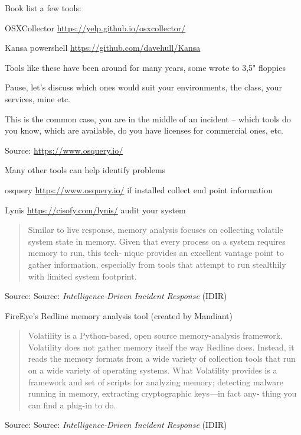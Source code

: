 \documentclass[Screen16to9,17pt]{foils}
\begin{document}
Book list a few tools:
\begin{list2}
\item OSXCollector \url{https://yelp.github.io/osxcollector/}
\item Kansa powershell \url{https://github.com/davehull/Kansa}
\item Tools like these have been around for many years, some wrote to 3,5" floppies
\end{list2}

Pause, let's discuss which ones would suit your environments, the class, your services, mine etc.

This is the common case, you are in the middle of an incident -- which tools do you know, which are available, do you have licenses for commercial ones, etc.


Source: \url{https://www.osquery.io/}

Many other tools can help identify problems
\begin{list2}
\item osquery \url{https://www.osquery.io/} if installed collect end point information
\item Lynis \url{https://cisofy.com/lynis/} audit your system
\end{list2}




\begin{quote}
Similar to live response, memory analysis focuses on collecting volatile system state
in memory. Given that every process on a system requires memory to run, this tech‐
nique provides an excellent vantage point to gather information, especially from tools
that attempt to run stealthily with limited system footprint.
\end{quote}
Source: Source: \emph{Intelligence-Driven Incident Response} (IDIR)

\begin{list2}
\item FireEye’s Redline memory analysis tool (created by Mandiant)
\end{list2}



\begin{quote}
Volatility is a Python-based, open source memory-analysis framework. Volatility does
not gather memory itself the way Redline does. Instead, it reads the memory formats
from a wide variety of collection tools that run on a wide variety of operating systems.
What Volatility provides is a framework and set of scripts for analyzing memory;
detecting malware running in memory, extracting cryptographic keys—in fact any‐
thing you can find a plug-in to do.
\end{quote}
Source: Source: \emph{Intelligence-Driven Incident Response} (IDIR)
\end{document}
